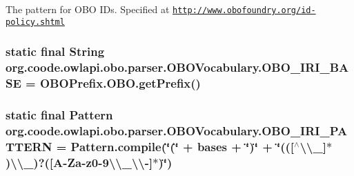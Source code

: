 The pattern for O\-B\-O I\-Ds. Specified at \href{http://www.obofoundry.org/id-policy.shtml}{\tt http\-://www.\-obofoundry.\-org/id-\/policy.\-shtml} \hypertarget{enumorg_1_1coode_1_1owlapi_1_1obo_1_1parser_1_1_o_b_o_vocabulary_a100cf24365c118368a03588b58fe2c7d}{
\subsubsection[{O\-B\-O\-\_\-\-I\-R\-I\-\_\-\-B\-A\-S\-E}]{\setlength{\rightskip}{0pt plus 5cm} static  final String org.\-coode.\-owlapi.\-obo.\-parser.\-O\-B\-O\-Vocabulary.\-O\-B\-O\-\_\-\-I\-R\-I\-\_\-\-B\-A\-S\-E = O\-B\-O\-Prefix.\-O\-B\-O.\-get\-Prefix()\hspace{0.3cm}{\ttfamily [static]}}}\label{enumorg_1_1coode_1_1owlapi_1_1obo_1_1parser_1_1_o_b_o_vocabulary_a100cf24365c118368a03588b58fe2c7d}
\hypertarget{enumorg_1_1coode_1_1owlapi_1_1obo_1_1parser_1_1_o_b_o_vocabulary_aefd704b1c8e0d9fd936247e2faaaabb0}{
\subsubsection[{O\-B\-O\-\_\-\-I\-R\-I\-\_\-\-P\-A\-T\-T\-E\-R\-N}]{\setlength{\rightskip}{0pt plus 5cm} static  final Pattern org.\-coode.\-owlapi.\-obo.\-parser.\-O\-B\-O\-Vocabulary.\-O\-B\-O\-\_\-\-I\-R\-I\-\_\-\-P\-A\-T\-T\-E\-R\-N = Pattern.\-compile(\char`\"{}(\char`\"{} + {\bf bases} + \char`\"{})\char`\"{} + \char`\"{}((\mbox{[}$^\wedge$\textbackslash{}\textbackslash{}\-\_\-\mbox{]}$\ast$)\textbackslash{}\textbackslash{}\-\_\-)?(\mbox{[}A-\/Za-\/z0-\/9\textbackslash{}\textbackslash{}\-\_\-\textbackslash{}\textbackslash{}-\/\mbox{]}$\ast$)\char`\"{})\hspace{0.3cm}{\ttfamily [static]}}}\label{enumorg_1_1coode_1_1owlapi_1_1obo_1_1parser_1_1_o_b_o_vocabulary_aefd704b1c8e0d9fd936247e2faaaabb0}
